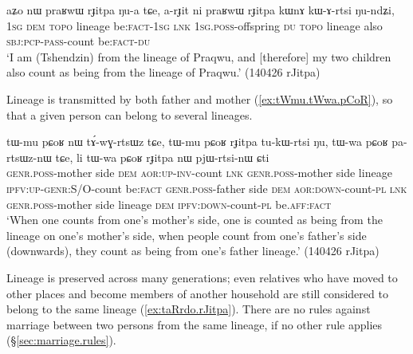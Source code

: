 \begin{exe}
\ex \label{ex:praRwW.rJitpa}
\gll   aʑo nɯ praʁwɯ rɟitpa ŋu-a tɕe, a-rɟit ni praʁwɯ rɟitpa kɯnɤ kɯ-ɤ-rtsi ŋu-ndʑi, \\
\textsc{1sg} \textsc{dem}  \textsc{topo} lineage be:\textsc{fact}-\textsc{1sg} \textsc{lnk} \textsc{1sg}.\textsc{poss}-offspring \textsc{du}  \textsc{topo} lineage also \textsc{sbj}:\textsc{pcp}-\textsc{pass}-count be:\textsc{fact}-\textsc{du} \\
\glt  `I am (Tshendzin) from the lineage of Praqwu, and [therefore] my two children also count as being from the lineage of Praqwu.' (140426 rJitpa)
\end{exe}

Lineage is transmitted by both father and mother (\ref{ex:tWmu.tWwa.pCoR}), so that a given person can belong to several lineages.

\begin{exe}
\ex \label{ex:tWmu.tWwa.pCoR}
\gll   tɯ-mu pɕoʁ nɯ tɤ́-wɣ-rtsɯz tɕe, tɯ-mu pɕoʁ rɟitpa tu-kɯ-rtsi ŋu, tɯ-wa pɕoʁ pa-rtsɯz-nɯ tɕe, li tɯ-wa pɕoʁ rɟitpa nɯ pjɯ-rtsi-nɯ ɕti   \\
\textsc{genr}.\textsc{poss}-mother side \textsc{dem} \textsc{aor}:\textsc{up}-\textsc{inv}-count \textsc{lnk} \textsc{genr}.\textsc{poss}-mother side lineage \textsc{ipfv}:\textsc{up}-\textsc{genr}:S/O-count be:\textsc{fact}  \textsc{genr}.\textsc{poss}-father side \textsc{dem} \textsc{aor}:\textsc{down}-count-\textsc{pl} \textsc{lnk} \textsc{genr}.\textsc{poss}-mother side lineage \textsc{dem} \textsc{ipfv}:\textsc{down}-count-\textsc{pl} be.\textsc{aff}:\textsc{fact}  \\
\glt  `When one counts from  one's mother's side, one is counted as being from the lineage on one's mother's side, when people count from one's father's side (downwards), they count as being from one's father lineage.' (140426 rJitpa)
 \end{exe}

Lineage is preserved across many generations; even relatives who have moved to other places and become members of another household are still considered to belong to the same lineage (\ref{ex:taRrdo.rJitpa}). There are no rules against marriage between two persons from the same lineage, if no other rule applies (§\ref{sec:marriage.rules}).

